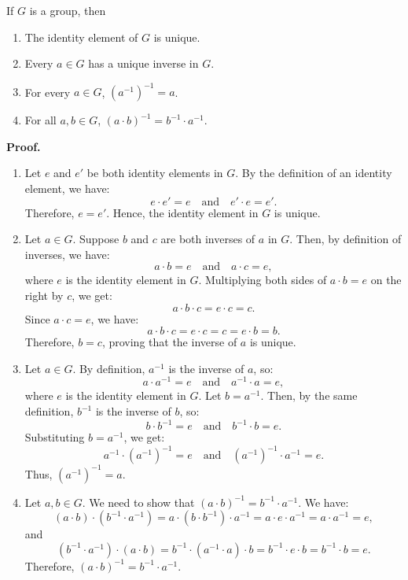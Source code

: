 \begin{lemma}
If \( G \) is a group, then
\begin{enumerate}
    \item The identity element of \( G \) is unique.
    \item Every \( a \in G \) has a unique inverse in \( G \).
    \item For every \( a \in G \), \( (a^{-1})^{-1} = a \).
    \item For all \( a, b \in G \), \( (a \cdot b)^{-1} = b^{-1} \cdot a^{-1} \).
\end{enumerate}
\end{lemma}
\textbf{Proof.}
\begin{enumerate}
    \item Let \( e \) and \( e' \) be both identity elements in \( G \). By the definition of an identity element, we have:
    \[ e \cdot e' = e \quad \text{and} \quad e' \cdot e = e'.\]
    Therefore, \( e = e' \). Hence, the identity element in \( G \) is unique.
    
    \item Let \( a \in G \). Suppose \( b \) and \( c \) are both inverses of \( a \) in \( G \). Then, by definition of inverses, we have:
    \[
    a \cdot b = e \quad \text{and} \quad a \cdot c = e,
    \]
    where \( e \) is the identity element in \( G \). Multiplying both sides of \( a \cdot b = e \) on the right by \( c \), we get:
    \[
    a \cdot b \cdot c = e \cdot c = c.
    \]
    Since \( a \cdot c = e \), we have:
    \[
    a \cdot b \cdot c = e \cdot c = c = e \cdot b = b.
    \]
    Therefore, \( b = c \), proving that the inverse of \( a \) is unique.
    
    \item Let \( a \in G \). By definition, \( a^{-1} \) is the inverse of \( a \), so:
    \[
    a \cdot a^{-1} = e \quad \text{and} \quad a^{-1} \cdot a = e,
    \]
    where \( e \) is the identity element in \( G \). Let \( b = a^{-1} \). Then, by the same definition, \( b^{-1} \) is the inverse of \( b \), so:
    \[
    b \cdot b^{-1} = e \quad \text{and} \quad b^{-1} \cdot b = e.
    \]
    Substituting \( b = a^{-1} \), we get:
    \[
    a^{-1} \cdot (a^{-1})^{-1} = e \quad \text{and} \quad (a^{-1})^{-1} \cdot a^{-1} = e.
    \]
    Thus, \((a^{-1})^{-1} = a\).
    
    \item Let \( a, b \in G \). We need to show that \( (a \cdot b)^{-1} = b^{-1} \cdot a^{-1} \). We have:
    \[
    (a \cdot b) \cdot (b^{-1} \cdot a^{-1}) = a \cdot (b \cdot b^{-1}) \cdot a^{-1} = a \cdot e \cdot a^{-1} = a \cdot a^{-1} = e,
    \]
    and
    \[
    (b^{-1} \cdot a^{-1}) \cdot (a \cdot b) = b^{-1} \cdot (a^{-1} \cdot a) \cdot b = b^{-1} \cdot e \cdot b = b^{-1} \cdot b = e.
    \]
    Therefore, \( (a \cdot b)^{-1} = b^{-1} \cdot a^{-1} \).
\end{enumerate}
